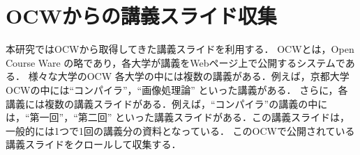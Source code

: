 \documentclass{js}
\begin{document}

\section{OCWからの講義スライド収集}

本研究ではOCWから取得してきた講義スライドを利用する．
OCWとは，Open Course Ware の略であり，各大学が講義をWebページ上で公開するシステムである．
様々な大学のOCW
各大学の中には複数の講義がある．例えば，京都大学OCWの中には``コンパイラ''，``画像処理論'' といった講義がある．
さらに，各講義には複数の講義スライドがある．例えば，``コンパイラ''の講義の中には，``第一回''，``第二回'' といった講義スライドがある．この講義スライドは，一般的には1つで1回の講義分の資料となっている．
このOCWで公開されている講義スライドをクロールして収集する．
\end{document}
